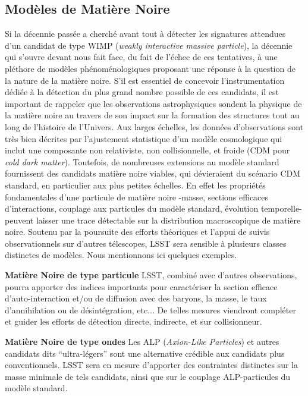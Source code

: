 \documentclass[12pt]{article}
\begin{document}
\vspace{-1em} \subsection*{Modèles de Matière Noire} \vspace{-0.5em}

Si la décennie passée a cherché avant tout à détecter les signatures attendues d'un candidat de type WIMP ({\it weakly interactive massive particle}), la décennie qui s'ouvre devant nous fait face, du fait de l'échec de ces tentatives, à une pléthore de modèles phénoménologiques proposant une réponse à la question de la nature de la matière noire. S'il est essentiel de concevoir l'instrumentation dédiée à la détection du plus grand nombre possible de ces candidats, il est important de rappeler que les observations astrophysiques sondent la physique de la matière noire au travers de son impact sur la formation des structures tout au long de l'histoire de l'Univers. Aux larges échelles, les données d'observations sont très bien décrites par l'ajustement statistique d'un modèle cosmologique qui inclut une composante non relativiste, non collisionnelle, et froide (CDM pour {\it cold dark matter}). Toutefois, de nombreuses extensions au modèle standard fournissent des candidats matière noire viables, qui dévieraient du scénario CDM standard, en particulier aux plus petites échelles. En effet les propriétés fondamentales d'une particule de matière noire -masse, sections efficaces d'interactions, couplage aux particules du modèle standard, évolution temporelle- peuvent laisser une trace détectable sur la distribution macroscopique de matière noire. Soutenu par la poursuite des efforts théoriques et l'appui de suivis observationnels sur d'autres télescopes, LSST sera sensible à plusieurs classes distinctes de modèles. Nous mentionnons ici quelques exemples.

\noindent \textbf{Matière Noire de type particule} LSST, combiné avec d'autres observations, pourra apporter des indices importants pour caractériser la section efficace d'auto-interaction et/ou de diffusion avec des baryons, la masse, le taux d'annihilation ou de désintégration, etc... De telles mesures viendront compléter et guider les efforts de détection directe, indirecte, et sur collisionneur.

\noindent \textbf{Matière Noire de type ondes} Les ALP ({\it Axion-Like Particles}) et autres candidats dits ``ultra-légers'' sont une alternative crédible aux candidats plus conventionnels. LSST sera en mesure d'apporter des contraintes distinctes sur la masse minimale de tels candidats, ainsi que sur le couplage ALP-particules du modèle standard.
\end{document}

